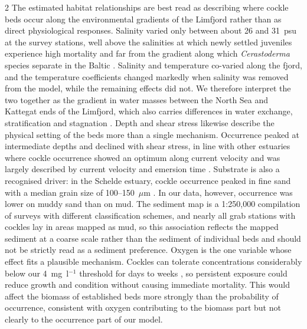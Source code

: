 \begin{spacing}{2}
The estimated habitat relationships are best read as describing where cockle beds occur along the environmental gradients of the Limfjord rather than as direct physiological responses. Salinity varied only between about 26 and 31~psu at the survey stations, well above the salinities at which newly settled juveniles experience high mortality \citep[about 15~psu;][]{peteiroResponsesSalinityStress2018} and far from the gradient along which \textit{Cerastoderma} species separate in the Baltic \citep{brockGeographicalDistributionCerastoderma1980}. Salinity and temperature co-varied along the fjord, and the temperature coefficients changed markedly when salinity was removed from the model, while the remaining effects did not. We therefore interpret the two together as the gradient in water masses between the North Sea and Kattegat ends of the Limfjord, which also carries differences in water exchange, stratification and stagnation \citep{schourup-kristensenDriversHypoxiaVariability2023}. Depth and shear stress likewise describe the physical setting of the beds more than a single mechanism. Occurrence peaked at intermediate depths and declined with shear stress, in line with other estuaries where cockle occurrence showed an optimum along current velocity \citep{ysebaertMacrobenthicSpeciesResponse2002} and was largely described by current velocity and emersion time \citep{katerDistributionCocklesCerastoderma2006}. Substrate is also a recognised driver: in the Schelde estuary, cockle occurrence peaked in fine sand with a median grain size of 100--150~$\mu$m \citep{ysebaertMacrobenthicSpeciesResponse2002}. In our data, however, occurrence was lower on muddy sand than on mud. The sediment map is a 1:250{,}000 compilation of surveys with different classification schemes, and nearly all grab stations with cockles lay in areas mapped as mud, so this association reflects the mapped sediment at a coarse scale rather than the sediment of individual beds and should not be strictly read as a sediment preference. Oxygen is the one variable whose effect fits a plausible mechanism. Cockles can tolerate concentrations considerably below our 4~mg~l$^{-1}$ threshold for days to weeks \citep{rosenbergHypoxicToleranceMarine1991}, so persistent exposure could reduce growth and condition without causing immediate mortality. This would affect the biomass of established beds more strongly than the probability of occurrence, consistent with oxygen contributing to the biomass part but not clearly to the occurrence part of our model.


\end{spacing}
